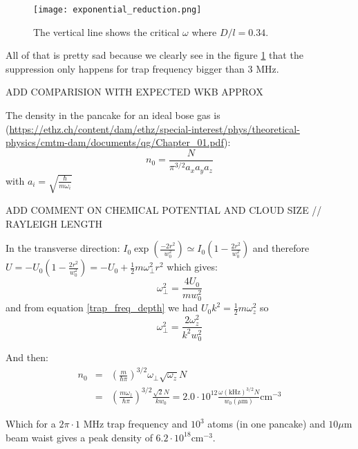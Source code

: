 \documentclass[reprint,amsmath,amssymb,aps,nofootinbib]{revtex4-1}
\begin{document}
\begin{figure}
\begin{center}
\texttt{[image: exponential\_reduction.png]}
\caption{\label{exponential_reduction}The vertical line shows the critical $\omega$ where $D/l=0.34$.}
\end{center}
\end{figure}

All of that is pretty sad because we clearly see in the figure \ref{exponential_reduction} that the suppression only happens for trap frequency bigger than 3 MHz.

ADD COMPARISION WITH EXPECTED WKB APPROX

The density in the pancake for an ideal bose gas is (\url{https://ethz.ch/content/dam/ethz/special-interest/phys/theoretical-physics/cmtm-dam/documents/qg/Chapter_01.pdf}):
\begin{equation}
n_{0} = \frac{N}{\pi^{3/2}a_{x}a_{y}a_{z}}
\end{equation}
with $a_{i} = \sqrt{\frac{\hbar}{m\omega_{i}}}$


ADD COMMENT ON CHEMICAL POTENTIAL AND CLOUD SIZE // RAYLEIGH LENGTH

In the transverse direction: $I_{0}\exp\left(\frac{-2r^{2}}{w_{0}^{2}}\right)\simeq I_{0}\left(1-\frac{2r^{2}}{w_{0}^{2}}\right)$ and therefore $U=-U_{0}\left(1-\frac{2r^{2}}{w_{0}^{2}}\right)=-U_{0}+\frac{1}{2}m\omega_{\perp}^{2}r^{2}$ which gives:
\begin{equation}
\label{eq:transverse_trap_freq}
\omega_{\perp}^{2}=\frac{4U_{0}}{mw_{0}^{2}}
\end{equation}
and from equation \ref{trap_freq_depth} we had $U_{0}k^{2} = \frac{1}{2}m\omega_{z}^{2}$ so
\begin{equation}
\label{trapping_freq_relation}
\omega_{\perp}^{2} = \frac{2\omega_{z}^{2}}{k^{2}w_{0}^{2}}
\end{equation}

And then:
\begin{equation}
\begin{array}{lllll}
n_{0} &=& \left(\frac{m}{\hbar\pi}\right)^{3/2}\omega_{\perp}\sqrt{\omega_{z}}N \\[10pt]
	&=& \left(\frac{m\omega_{z}}{\hbar\pi}\right)^{3/2}\frac{\sqrt{2}N}{kw_{0}} = 2.0\cdot 10^{12} \frac{\omega(\text{kHz})^{3/2}N}{w_{0}(\mu\text{m})}\text{cm}^{-3}
\end{array}
\end{equation}

Which for a $2\pi\cdot1\text{ MHz}$ trap frequency and $10^{3}$ atoms (in one pancake) and $10\mu$m beam waist gives a peak density of $6.2\cdot 10^{18}\text{cm}^{-3}$.
\end{document}

